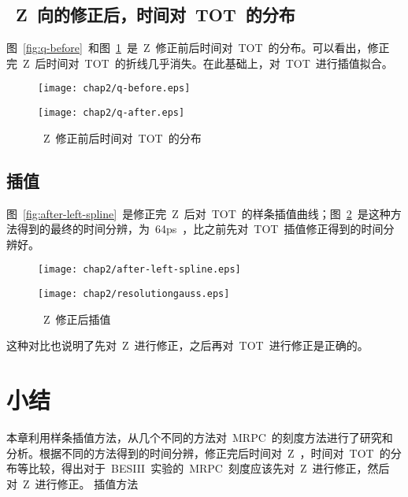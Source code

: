 \subsection{~Z~向的修正后，时间对~TOT~的分布}

图~\ref{fig:q-before}~和图~\ref{fig:q-after}~是~Z~修正前后时间对~TOT~的分布。可以看出，修正完~Z~后时间对~TOT~的折线几乎消失。在此基础上，对~TOT~进行插值拟合。
\begin{figure}[!h]
\begin{minipage}[!h]{0.5\linewidth}
\texttt{[image: chap2/q-before.eps]}
\label{fig:q-before}
\end{minipage}%
\hfill
\begin{minipage}[!h]{0.5\linewidth}
\texttt{[image: chap2/q-after.eps]}
\label{fig:q-after}
\end{minipage}
\caption{~Z~修正前后时间对~TOT~的分布}
\end{figure}

\subsection{插值}

图~\ref{fig:after-left-spline}~是修正完~Z~后对~TOT~的样条插值曲线；图~\ref{fig:resolutiongauss}~是这种方法得到的最终的时间分辨，为~64ps~，比之前先对~TOT~插值修正得到的时间分辨好。
\begin{figure}[!h]
\begin{minipage}[!h]{0.5\linewidth}
\texttt{[image: chap2/after-left-spline.eps]}
\label{fig:after-left-spline}
\end{minipage}%
\hfill
\begin{minipage}[!h]{0.5\linewidth}
\texttt{[image: chap2/resolutiongauss.eps]}
\label{fig:resolutiongauss}
\end{minipage}
\caption{~Z~修正后插值}
\end{figure}

这种对比也说明了先对~Z~进行修正，之后再对~TOT~进行修正是正确的。

\section{小结}

本章利用样条插值方法，从几个不同的方法对~MRPC~的刻度方法进行了研究和分析。根据不同的方法得到的时间分辨，修正完后时间对~Z~，时间对~TOT~的分布等比较，得出对于~BESIII~实验的~MRPC~刻度应该先对~Z~进行修正，然后对~Z~进行修正。
插值方法
